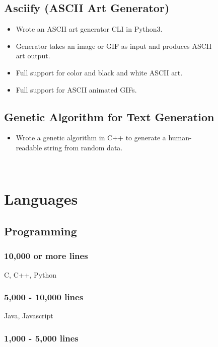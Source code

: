 \documentclass[]{article}
\theoremstyle{plain}
\theoremstyle{remark}
\theoremstyle{definition}
\begin{document}
\begin{figure}
\begin{minipage}[t]{0.65\textwidth}
\subsection{Asciify (ASCII Art Generator)}
\begin{itemize}[itemsep=0em]
\item Wrote an ASCII art generator CLI in Python3.
\item Generator takes an image or GIF as input and produces ASCII art output.
\item Full support for color and black and white ASCII art.
\item Full support for ASCII animated GIFs.
\end{itemize}

\subsection{Genetic Algorithm for Text Generation}
\begin{itemize}[itemsep=0em]
\item Wrote a genetic algorithm in C++ to generate a human-readable string from random data.
\end{itemize}

\end{minipage}
\hfill
\begin{minipage}[t]{0.32\textwidth}
\color{gray}
\ %
\vspace{-1.5em}

\section{Languages}

\subsection{Programming}

\subsubsection{10,000 or more lines}

C, C++, Python

\subsubsection{5,000 - 10,000 lines}

Java, Javascript

\subsubsection{1,000 - 5,000 lines}


\end{minipage}
\end{figure}
\end{document}
